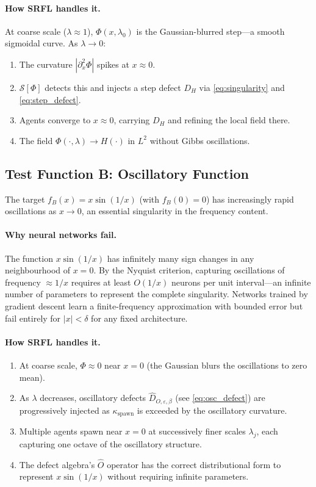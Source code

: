 \documentclass[12pt,a4paper]{article}
\theoremstyle{plain}
\theoremstyle{definition}
\theoremstyle{remark}
\newcommand{\cS}{\mathcal{S}}
\newcommand{\abs}[1]{\left|#1\right|}
\newcommand{\Dhat}[1]{\hat{D}_{#1}}
\newcommand{\eps}{\varepsilon}
\begin{document}
\paragraph{How SRFL handles it.}
At coarse scale ($\lambda \approx 1$), $\Phi(x, \lambda_0)$ is the
Gaussian-blurred step—a smooth sigmoidal curve.  As $\lambda \to 0$:
\begin{enumerate}[label=(\roman*)]
  \item The curvature $\abs{\partial^2_x \Phi}$ spikes at $x \approx 0$.
  \item $\cS[\Phi]$ detects this and injects a step defect $D_H$
    via \eqref{eq:singularity} and \eqref{eq:step_defect}.
  \item Agents converge to $x \approx 0$, carrying $D_H$ and refining
    the local field there.
  \item The field $\Phi(\cdot, \lambda) \to H(\cdot)$ in $L^2$ without
    Gibbs oscillations.
\end{enumerate}

\subsection{Test Function B: Oscillatory Function}

The target $f_B(x) = x\sin(1/x)$ (with $f_B(0) = 0$) has increasingly
rapid oscillations as $x \to 0$, an essential singularity in the
frequency content.

\paragraph{Why neural networks fail.}
The function $x\sin(1/x)$ has infinitely many sign changes in any
neighbourhood of $x=0$.  By the Nyquist criterion, capturing oscillations
of frequency $\approx 1/x$ requires at least $O(1/x)$ neurons per unit
interval—an infinite number of parameters to represent the complete
singularity.  Networks trained by gradient descent learn a finite-frequency
approximation with bounded error but fail entirely for $|x| < \delta$
for any fixed architecture.

\paragraph{How SRFL handles it.}
\begin{enumerate}[label=(\roman*)]
  \item At coarse scale, $\Phi \approx 0$ near $x=0$ (the Gaussian
    blurs the oscillations to zero mean).
  \item As $\lambda$ decreases, oscillatory defects $\Dhat{O,\eps,\beta}$
    (see \eqref{eq:osc_defect}) are progressively injected as
    $\kappa_\text{spawn}$ is exceeded by the oscillatory curvature.
  \item Multiple agents spawn near $x=0$ at successively finer scales
    $\lambda_j$, each capturing one octave of the oscillatory structure.
  \item The defect algebra's $\hat{O}$ operator has the correct
    distributional form to represent $x\sin(1/x)$ without requiring
    infinite parameters.
\end{enumerate}
\end{document}
